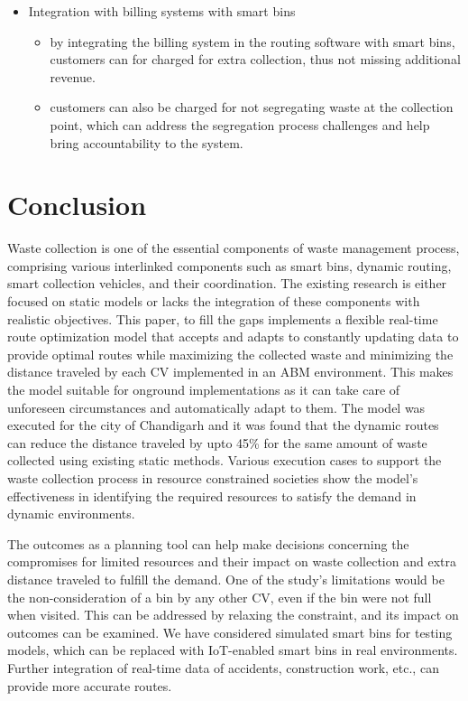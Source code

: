 \documentclass[12pt]{article}
\begin{document}
\begin{itemize}
\begin{itemize}
\begin{itemize}
 \end{itemize}
 \item Integration with billing systems with smart bins
   \begin{itemize}
 \item by integrating the billing system in the routing software with smart bins, customers can for charged for extra collection, thus not missing additional revenue. \item customers can also be charged for not segregating waste at the collection point, which can address the segregation process challenges and help bring accountability to the system.

\end{itemize}
\end{itemize}
\end{itemize}
\section{Conclusion}
Waste collection is one of the essential components of waste management process, comprising various interlinked components such as smart bins, dynamic routing, smart collection vehicles, and their coordination. The existing research is either focused on static models or lacks the integration of these components with realistic objectives. This paper, to fill the gaps implements a flexible real-time route optimization model that accepts and adapts to constantly updating data to provide optimal routes while maximizing the collected waste and minimizing the distance traveled by each CV implemented in an ABM environment. This makes the model suitable for onground implementations as it can take care of unforeseen circumstances and automatically adapt to them. The model was executed for the city of Chandigarh and it was found that the dynamic routes can reduce the distance traveled by upto 45\% for the same amount of waste collected using existing static methods. Various execution cases to support the waste collection process in resource constrained societies show the model's effectiveness in identifying the required resources to satisfy the demand in dynamic environments. 

The outcomes as a planning tool can help make decisions concerning the compromises for limited resources and their impact on waste collection and extra distance traveled to fulfill the demand. One of the study's limitations would be the non-consideration of a bin by any other CV, even if the bin were not full when visited. This can be addressed by relaxing the constraint, and its impact on outcomes can be examined. We have considered simulated smart bins for testing models, which can be replaced with IoT-enabled smart bins in real environments. Further integration of real-time data of accidents, construction work, etc., can provide more accurate routes.
\end{document}
